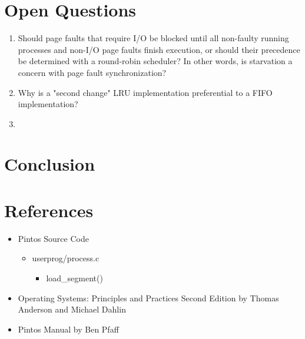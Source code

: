 \documentclass[11pt, letterpaper]{article}
\begin{document}
\section*{Open Questions}

\begin{enumerate}
\item Should page faults that require I/O be blocked until all non-faulty running processes and non-I/O page faults finish execution, or should their precedence be determined with a round-robin scheduler? In other words, is starvation a concern with page fault synchronization?
\item Why is a "second change" LRU implementation preferential to a FIFO implementation?
\item 
\end{enumerate}



\section*{Conclusion}

\pagebreak
\begin{appendices}

%

\pagebreak

%

\end{appendices}

\pagebreak

\section*{References}
	
\begin{itemize}
\item Pintos Source Code
	\begin{itemize}
	\item userprog/process.c
	\begin{itemize}
		\item load\_segment()	
	\end{itemize}

	\end{itemize}
\item Operating Systems: Principles and Practices Second Edition by Thomas Anderson and Michael Dahlin
\item Pintos Manual by Ben Pfaff
\end{itemize}
\end{document}
